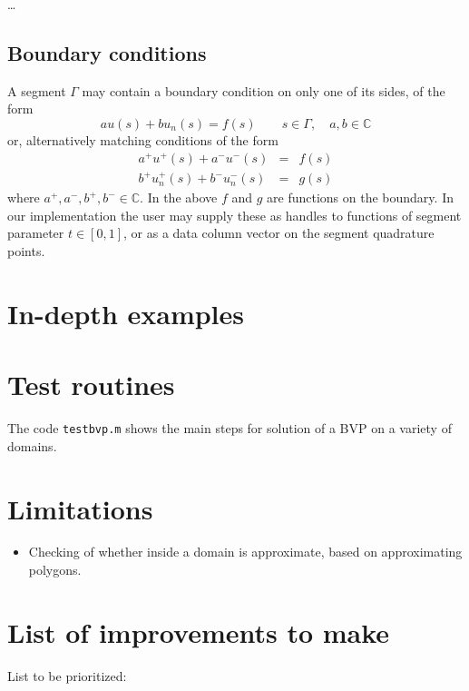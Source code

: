 \documentclass[12pt]{article}
\newcommand{\bi}{\begin{itemize}}
\newcommand{\ei}{\end{itemize}}
\newcommand{\bea}{\begin{eqnarray}}
\newcommand{\eea}{\end{eqnarray}}
\begin{document}
\ldots

\subsection{Boundary conditions}

A segment $\Gamma$ may contain a boundary condition on only one of its sides,
of the form
$$
a u(s) + b u_n(s) = f(s)  \qquad s\in\Gamma, \quad a,b \in \mathbb{C}
$$
or, alternatively matching conditions of the form
\bea
a^+ u^+(s) + a^- u^-(s) &=& f(s)\\
b^+ u_n^+(s) + b^- u_n^-(s) &=& g(s)
\eea
where $a^+,a^-,b^+,b^- \in \mathbb{C}$.
In the above $f$ and $g$ are functions on the boundary.
In our implementation the user
may supply these as handles to functions of segment parameter
$t\in[0,1]$, or as a data column vector on the segment quadrature points.

\section{In-depth examples}

\section{Test routines}

The code {\tt testbvp.m} shows the main steps for solution of a BVP on
a variety of domains.

\section{Limitations}

\bi
\item Checking of whether inside a domain is approximate, based on approximating
polygons.
\ei

\section{List of improvements to make}

List to be prioritized:
\end{document}
